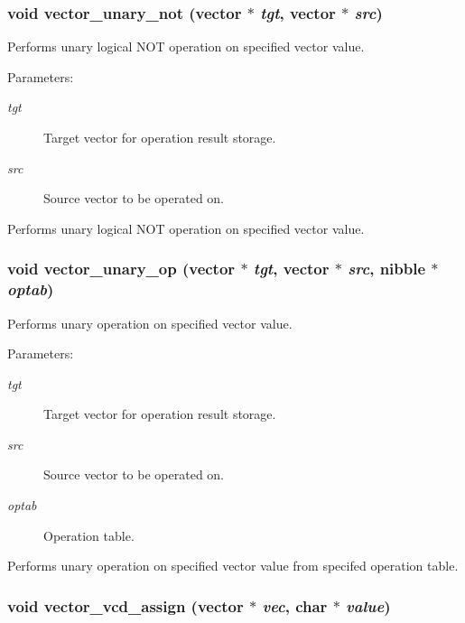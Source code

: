 \subsubsection{\setlength{\rightskip}{0pt plus 5cm}void vector\_\-unary\_\-not ({\bf vector} $\ast$ {\em tgt}, {\bf vector} $\ast$ {\em src})}\label{vector_8c_a40}


Performs unary logical NOT operation on specified vector value.

\begin{Desc}
\item[Parameters: ]\par
\begin{description}
\item[{\em 
tgt}]Target vector for operation result storage. \item[{\em 
src}]Source vector to be operated on.\end{description}
\end{Desc}
Performs unary logical NOT operation on specified vector value. 
\subsubsection{\setlength{\rightskip}{0pt plus 5cm}void vector\_\-unary\_\-op ({\bf vector} $\ast$ {\em tgt}, {\bf vector} $\ast$ {\em src}, {\bf nibble} $\ast$ {\em optab})}\label{vector_8c_a39}


Performs unary operation on specified vector value.

\begin{Desc}
\item[Parameters: ]\par
\begin{description}
\item[{\em 
tgt}]Target vector for operation result storage. \item[{\em 
src}]Source vector to be operated on. \item[{\em 
optab}]Operation table.\end{description}
\end{Desc}
Performs unary operation on specified vector value from specifed operation table. 
\subsubsection{\setlength{\rightskip}{0pt plus 5cm}void vector\_\-vcd\_\-assign ({\bf vector} $\ast$ {\em vec}, char $\ast$ {\em value})}\label{vector_8c_a30}


